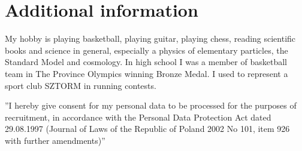 \documentclass[a4paper,12pt]{article}
\begin{document}
\section{Additional information}
	My hobby is playing basketball, playing guitar, playing chess, reading scientific books and science in general, especially a
	physics of elementary particles, the Standard Model and cosmology. In high school I was a member of basketball
	team in The Province Olympics winning Bronze Medal. I used to represent a sport club SZTORM in running contests.
\vfill{}

\begin{center}
{\scriptsize
	''I hereby give consent for my personal data to be processed for the purposes of recruitment,
	in accordance with the Personal Data Protection Act dated 29.08.1997
	(Journal of Laws of the Republic of Poland 2002 No 101, item 926 with further amendments)''}
\end{center}
\end{document}
